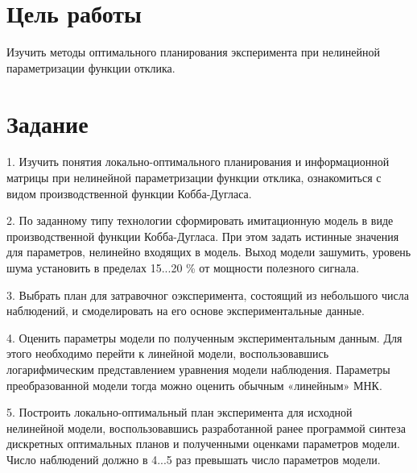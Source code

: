 ﻿%

\newcommand{\rb}[1]{ \left(#1\right) }




\section{Цель работы}
Изучить методы оптимального планирования эксперимента при нелинейной параметризации функции отклика.


\section{Задание}

1. Изучить понятия локально-оптимального планирования и информационной
матрицы при нелинейной параметризации функции отклика, ознакомиться с видом
производственной функции Кобба-Дугласа.

2. По заданному типу технологии сформировать имитационную модель в виде
производственной функции Кобба-Дугласа. При этом задать истинные значения
для параметров, нелинейно входящих в модель. Выход модели зашумить, уровень
шума установить в пределах 15...20 \% от мощности полезного сигнала.

3. Выбрать план для затравочног оэксперимента, состоящий из небольшого числа
наблюдений, и смоделировать на его основе экспериментальные данные.

4. Оценить параметры модели по полученным экспериментальным данным. Для
этого необходимо перейти к линейной модели, воспользовавшись логарифмическим
представлением уравнения модели наблюдения. Параметры преобразованной модели
тогда можно оценить обычным «линейным» МНК.

5. Построить локально-оптимальный план эксперимента для исходной нелинейной
модели, воспользовавшись разработанной ранее программой синтеза дискретных
оптимальных планов и полученными оценками параметров модели. Число наблюдений
должно в 4...5 раз превышать число параметров модели.

